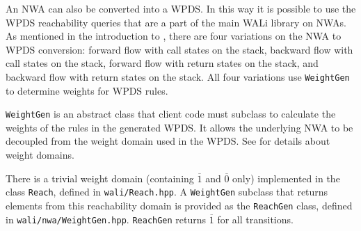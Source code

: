 An NWA can also be converted into a WPDS.  In this way it is possible to use
the WPDS reachability queries that are a part of the main WALi library on
NWAs.  As mentioned in the introduction to , there are
four variations on the NWA to WPDS conversion: forward flow with call states
on the stack, backward flow with call states on the stack, forward flow with
return states on the stack, and backward flow with return states on the
stack. All four variations use \texttt{WeightGen} to determine weights for
WPDS rules.

\texttt{WeightGen} is an abstract class that client code must subclass to
calculate the weights of the rules in the generated WPDS.  It allows the
underlying NWA to be decoupled from the weight domain used in the WPDS.  See
\cite[\S4-\S5]{wali} for details about weight domains.

There is a trivial weight domain (containing $\overline{1}$ and
$\overline{0}$ only) implemented in the class \texttt{Reach}, defined in
\texttt{wali/Reach.hpp}. A \texttt{WeightGen} subclass that returns elements
from this reachability domain is provided as the \texttt{ReachGen} class,
defined in \texttt{wali/nwa/WeightGen.hpp}. \texttt{ReachGen} returns
$\overline{1}$ for all transitions.


